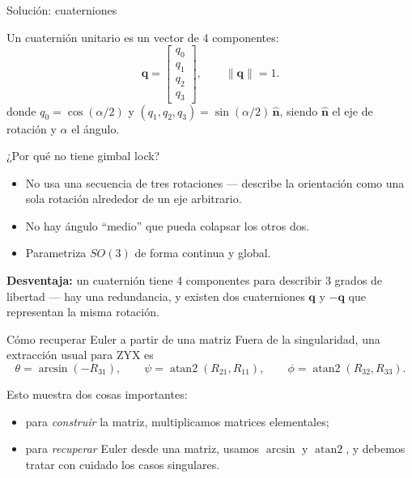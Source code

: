 \documentclass[11pt]{beamer}
\begin{document}
\begin{frame}{Solución: cuaterniones}

\small
Un cuaternión unitario es un vector de 4 componentes:
\[
  \bm{q} = \begin{bmatrix} q_0 \\ q_1 \\ q_2 \\ q_3 \end{bmatrix},
  \qquad \|\bm{q}\| = 1.
\]
donde \(q_0 = \cos(\alpha/2)\) y \((q_1, q_2, q_3) = \sin(\alpha/2)\,\hat{\bm{n}}\),
siendo \(\hat{\bm{n}}\) el eje de rotación y \(\alpha\) el ángulo.

\medskip
¿Por qué no tiene gimbal lock?
\begin{itemize}
  \item No usa una secuencia de tres rotaciones — describe la orientación
  como una sola rotación alrededor de un eje arbitrario.
  \item No hay ángulo ``medio'' que pueda colapsar los otros dos.
  \item Parametriza \(SO(3)\) de forma continua y global.
\end{itemize}

\medskip
\textbf{Desventaja:} un cuaternión tiene 4 componentes para describir
3 grados de libertad — hay una redundancia, y existen dos cuaterniones
\(\bm{q}\) y \(-\bm{q}\) que representan la misma rotación.

\end{frame}


\begin{frame}{Cómo recuperar Euler a partir de una matriz}
\small
Fuera de la singularidad, una extracción usual para ZYX es
\[
\theta = \arcsin(-R_{31}),
\qquad
\psi = \operatorname{atan2}(R_{21},R_{11}),
\qquad
\phi = \operatorname{atan2}(R_{32},R_{33}).
\]

\medskip
Esto muestra dos cosas importantes:
\begin{itemize}
  \item para \emph{construir} la matriz, multiplicamos matrices elementales;
  \item para \emph{recuperar} Euler desde una matriz, usamos \(\arcsin\) y \(\operatorname{atan2}\), y debemos tratar con cuidado los casos singulares.
\end{itemize}

\end{frame}
\end{document}
